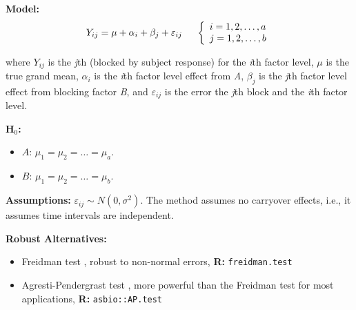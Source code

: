 \documentclass[12pt,english]{article}\usepackage[]{graphicx}\usepackage[table]{xcolor}
\begin{document}
\noindent \textbf{Model:} \[Y_{ij} = \mu + \alpha_i + \beta_j + \varepsilon_{ij} \hspace{0.2in} \left\{
\begin{array}{ll}
                  i = 1,2,\dots,a\\
                  j = 1,2,\dots,b\\
                  \end{array}
              \right.\]

\noindent where $Y_{ij}$ is the \textit{j}th (blocked by subject response) for the \textit{i}th factor level, $\mu$ is the true grand mean, $\alpha_i$ is the \textit{i}th factor level effect from \textit{A}, $\beta_j$ is the \textit{j}th factor level effect from blocking factor \textit{B}, and $\varepsilon_{ij}$ is the error the \textit{j}th block and the \textit{i}th factor level. \\
\vspace{0.05in}


\noindent \textbf{H$_0$:}
\begin{itemize}
\item $A$: $\mu_1 = \mu_2 = \dots = \mu_a$.
\item $B$: $\mu_1 = \mu_2 = \dots = \mu_b$.
\end{itemize}
\vspace{0.1in}

\noindent \textbf{Assumptions:} $\varepsilon_{ij} \sim N(0, \sigma^2)$.  The method assumes no carryover effects, i.e., it assumes time intervals are independent.
\vspace{0.1in}

\noindent \textbf{Robust Alternatives:}
\begin{small}
\begin{itemize}
\item Freidman test \citep{kruskal1952}, robust to non-normal errors, \textbf{R:} \texttt{freidman.test}\vspace{-.1in}
\item Agresti-Pendergrast test \citep{agresti1986}, more powerful than the Freidman test for most applications, \textbf{R:} \texttt{asbio::AP.test}
\end{itemize}
\end{small}
\vspace{0.1in}
\end{document}
